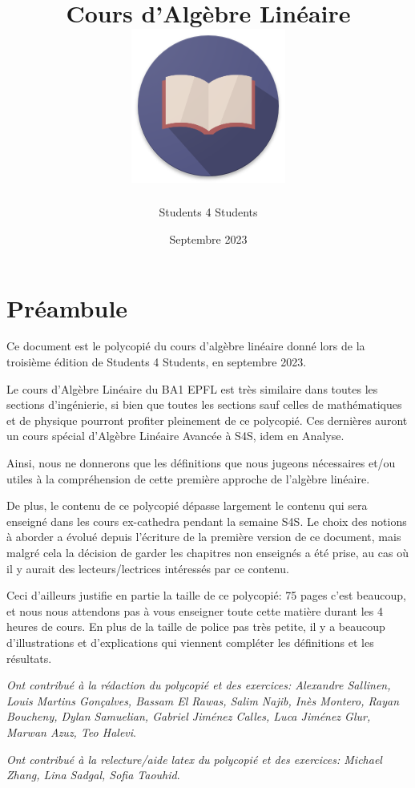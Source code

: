\documentclass[oneside,12pt,french,table]{book}
\title{
    Cours d'Algèbre Linéaire \\ \vspace{0.5cm}
    \includegraphics[scale=0.5]{assets/imgs/logo-round.png}
}
\author{Students 4 Students}
\date{Septembre 2023}
\theoremstyle{definition}
\theoremstyle{plain}
\theoremstyle{remark}
\theoremstyle{plain}
\theoremstyle{plain}
\theoremstyle{plain}
\begin{document}
\graphicspath{ {./assets/imgs/} }

\maketitle

\tableofcontents

\setcounter{chapter}{-1}
\chapter{Préambule}
Ce document est le polycopié du cours d'algèbre linéaire donné lors de la troisième édition de Students 4 Students, en septembre 2023.

Le cours d'Algèbre Linéaire du BA1 EPFL est très similaire dans toutes les sections d'ingénierie, si bien que toutes les sections sauf celles de mathématiques et de physique pourront profiter pleinement de ce polycopié. Ces dernières auront un cours spécial d'Algèbre Linéaire Avancée à S4S, idem en Analyse.

Ainsi, nous ne donnerons que les définitions que nous jugeons nécessaires et/ou utiles à la compréhension de cette première approche de l'algèbre linéaire.

De plus, le contenu de ce polycopié dépasse largement le contenu qui sera enseigné dans les cours ex-cathedra pendant la semaine S4S. Le choix des notions à aborder a évolué depuis l'écriture de la première version de ce document, mais malgré cela la décision de garder les chapitres non enseignés a été prise, au cas où il y aurait des lecteurs/lectrices intéressés par ce contenu.

Ceci d'ailleurs justifie en partie la taille de ce polycopié: 75 pages c'est beaucoup, et nous nous attendons pas à vous enseigner toute cette matière durant les 4 heures de cours. En plus de la taille de police pas très petite, il y a beaucoup d'illustrations et d'explications qui viennent compléter les définitions et les résultats.

\textit{Ont contribué à la rédaction du polycopié et des exercices: Alexandre Sallinen, Louis Martins Gonçalves, Bassam El Rawas, Salim Najib, Inès Montero, Rayan Boucheny, Dylan Samuelian, Gabriel Jiménez Calles, Luca Jiménez Glur, Marwan Azuz, Teo Halevi}.

\textit{Ont contribué à la relecture/aide latex du polycopié et des exercices: Michael Zhang, Lina Sadgal, Sofia Taouhid}.






\end{document}
